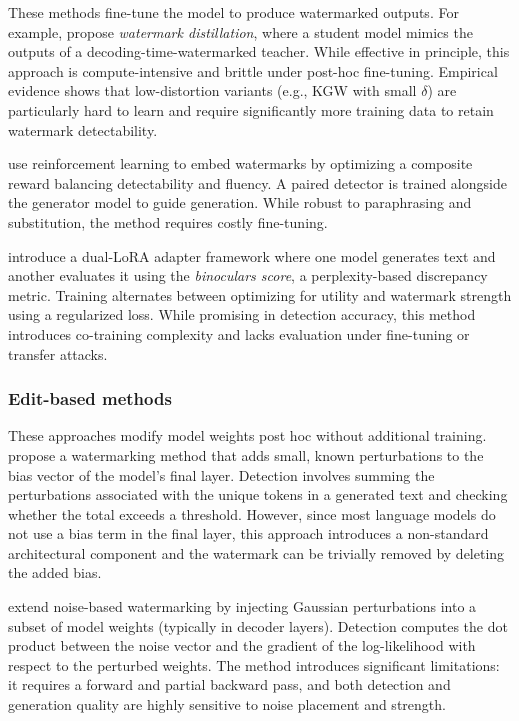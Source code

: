 These methods fine-tune the model to produce watermarked outputs. For example, \citet{gu2023learnability} propose \emph{watermark distillation}, where a student model mimics the outputs of a decoding-time-watermarked teacher. While effective in principle, this approach is compute-intensive and brittle under post-hoc fine-tuning. Empirical evidence shows that low-distortion variants (e.g., KGW with small \(\delta\)) are particularly hard to learn and require significantly more training data to retain watermark detectability. 

\citet{xu2024learningwatermarkllmgeneratedtext} use reinforcement learning to embed watermarks by optimizing a composite reward balancing detectability and fluency. A paired detector is trained alongside the generator model to guide generation. While robust to paraphrasing and substitution, the method requires costly fine-tuning. 

\citet{elhassan2025can} introduce a dual-LoRA adapter framework where one model generates text and another evaluates it using the \emph{binoculars score}, a perplexity-based discrepancy metric. Training alternates between optimizing for utility and watermark strength using a regularized loss. While promising in detection accuracy, this method introduces co-training complexity and lacks evaluation under fine-tuning or transfer attacks.

\subsubsection{Edit-based methods} 
These approaches modify model weights post hoc without additional training.
\citet{christ2024provably} propose a watermarking method that adds small, known perturbations to the bias vector of the model's final layer. Detection involves summing the perturbations associated with the unique tokens in a generated text and checking whether the total exceeds a threshold. However, since most language models do not use a bias term in the final layer, this approach introduces a non-standard architectural component and the watermark can be trivially removed by deleting the added bias.

\citet{block2025gaussmark} extend noise-based watermarking by injecting Gaussian perturbations into a subset of model weights (typically in decoder layers). Detection computes the dot product between the noise vector and the gradient of the log-likelihood with respect to the perturbed weights. The method introduces significant limitations: it requires a forward and partial backward pass, and both detection and generation quality are highly sensitive to noise placement and strength.

